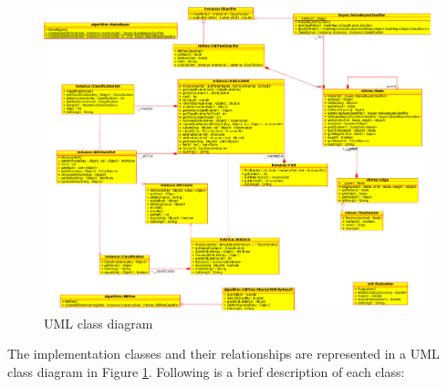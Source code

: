 \documentclass[10pt]{report}
\begin{document}
\begin{figure}
  \begin{center}
	\includegraphics[angle=90,width=\textwidth,height=!]{uml}
  \end{center}
  \caption{UML class diagram}
  \label{fig:uml}
\end{figure} 

The implementation classes and their relationships are represented in a UML
class diagram in Figure \ref{fig:uml}. Following is a brief
description of each class:
\end{document}
